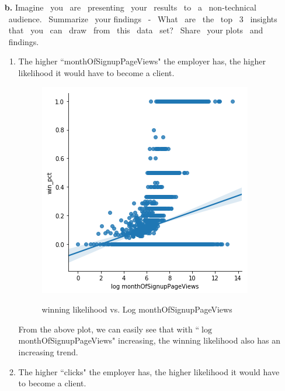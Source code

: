 \documentclass[12pt]{report}
\begin{document}
\begin{enumerate}
\begin{enumerate}
	\end{enumerate}

	
	\item[\textbf{b.}] Imagine  you  are  presenting  your  results  to  a  non-­technical  audience.  Summarize  your 
	findings  -­  What  are  the  top  3  insights  that  you  can  draw  from  this  data  set?  Share  your 
	plots  and  findings.
	
	\begin{enumerate}
		\item The higher ``monthOfSignupPageViews" the employer has, the higher likelihood it would have to become a client.
		
		\begin{figure}[h!]
			\caption{winning likelihood vs. Log monthOfSignupPageViews}
			\centering
			\includegraphics[scale=.8]{top1.png}
			\label{top1}
		\end{figure}
	
	From the above plot, we can easily see that with ``$\log$ monthOfSignupPageViews" increasing, the winning likelihood also has an increasing trend.
	
	\item The higher ``clicks" the employer has, the higher likelihood it would have to become a client.
	

\end{enumerate}
\end{enumerate}
\end{document}

